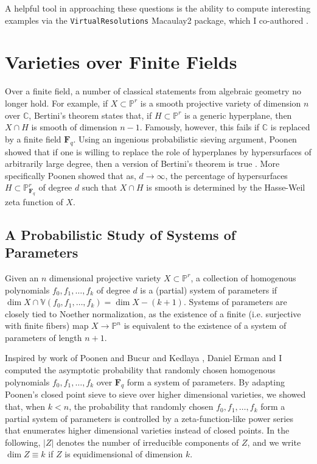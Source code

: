 \documentclass[11pt,reqno]{amsart}
\theoremstyle{remark}
\newcommand{\fF}{\mathbf F}
\newcommand{\C}{\mathbb{C}}
\renewcommand{\P}{\mathbb{P}}
\newcommand{\V}{\mathbb{V}}
\begin{document}
A helpful tool in approaching these questions is the ability to compute interesting examples via the  \texttt{VirtualResolutions} Macaulay2 package, which I co-authored \cite{almousaBruce19}.
 
\section{Varieties over Finite Fields}

Over a finite field, a number of classical statements from algebraic geometry no longer hold. For example, if $X\subset\P^r$ is a smooth projective variety of dimension $n$ over $\C$, Bertini's theorem states that, if $H\subset \P^r$ is a generic hyperplane, then $X\cap H$ is smooth of dimension $n-1$. Famously, however, this fails if $\C$ is replaced by a finite field $\fF_{q}$. Using an ingenious probabilistic sieving argument, Poonen showed that if one is willing to replace the role of hyperplanes by hypersurfaces of arbitrarily large degree, then a version of Bertini's theorem is true \cite{poonen04}. More specifically Poonen showed that as, $d\to\infty$, the percentage of hypersurfaces $H\subset \P_{\fF_{q}}^{r}$ of degree $d$ such that $X\cap H$ is smooth is determined by the Hasse-Weil zeta function of $X$.


\subsection{A Probabilistic Study of Systems of Parameters} 

Given an $n$ dimensional projective variety $X\subset \P^r$, a collection of homogenous polynomials $f_{0},f_{1},\ldots,f_{k}$ of degree $d$ is a (partial) system of parameters if $\dim X\cap \V(f_{0},f_{1},\ldots,f_{k}) = \dim X - (k+1)$. Systems of parameters are closely tied to Noether normalization, as the existence of a finite (i.e. surjective with finite fibers) map $X\rightarrow \P^n$ is equivalent to the existence of a system of parameters of length $n+1$.

Inspired by work of Poonen \cite{poonen04} and Bucur and Kedlaya \cite{bucurKedlaya12}, Daniel Erman and I computed the asymptotic probability that randomly chosen homogenous polynomials $f_{0},f_{1},\ldots,f_{k}$ over $\fF_{q}$ form a system of parameters. By adapting Poonen's closed point sieve to sieve over higher dimensional varieties, we showed that, when $k<n$, the probability that randomly chosen $f_{0},f_{1},\ldots,f_{k}$ form a partial system of parameters is controlled by a zeta-function-like power series that enumerates higher dimensional varieties instead of closed points. In the following, $|Z|$ denotes the number of irreducible components of $Z$, and we write $\dim Z \equiv k$ if $Z$ is equidimensional of dimension $k$. 
\end{document}
